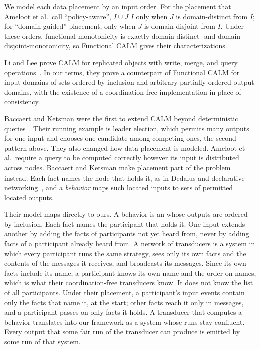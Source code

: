 We model each data placement by an input order.  For the placement that
Ameloot et al.\ call ``policy-aware'', $I\cup J$ \inrel $I$ only when $J$ is domain-distinct from $I$; for ``domain-guided''
placement, only when $J$ is domain-disjoint from $I$.  Under these orders,
functional monotonicity is exactly domain-distinct- and
domain-disjoint-monotonicity, so Functional CALM gives their
characterizations.

Li and Lee prove CALM for replicated objects with write, merge, and query
operations~\cite{li2025coordinationfree}.  In our terms, they prove a
counterpart of Functional CALM for input domains of sets ordered by inclusion
and arbitrary partially ordered output domains, with the existence of a
coordination-free implementation in place of consistency.

Baccaert and Ketsman were the first to extend CALM beyond deterministic
queries~\cite{baccaert2023dcbq,baccaert2026spectrum}.  Their running example
is leader election, which permits many outputs for one input and chooses one
candidate among competing ones, the second pattern above.  They also
changed how data placement is modeled.  Ameloot et al.\ require a query to be
computed correctly however its input is distributed across nodes.  Baccaert
and Ketsman make placement part of the problem instead.  Each fact names the
node that holds it, as in Dedalus and declarative
networking~\cite{alvaro2010dedalus,loo2009declarative}, and a
\emph{behavior} maps such located inputs to sets of permitted located outputs.

Their model maps directly to ours.  A behavior is an \spectype whose outputs
are ordered by inclusion.  Each fact names the participant that holds it.  One
input extends another by adding the facts of participants not yet heard from,
never by adding facts of a participant already heard from.  A network of
transducers is a system in which every participant runs the same strategy,
sees only its own facts and the contents of the messages it receives, and
broadcasts its messages.  Since its own facts include its name, a participant
knows its own name and the order on names, which is what their coordination-free
transducers know.  It does not know the list of all participants.  Under their
placement, a participant's input events contain only the facts that name it, at
the start; other facts reach it only in messages, and a participant passes on
only facts it holds.  A
transducer that computes a behavior translates into our framework as a system
whose runs stay confluent.  Every output that some fair run of the transducer can produce is
emitted by some run of that system.

